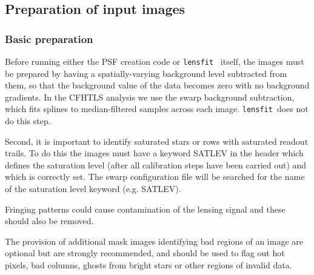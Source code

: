 \documentclass{article}
\def\lensfit{{\tt lensfit}\ }
\begin{document}
\subsection{Preparation of input images}
\subsubsection{Basic preparation}
Before running either the PSF creation code or \lensfit 
itself, the images must be prepared by having a 
spatially-varying background level subtracted from them, so that the background value of the data becomes 
zero with no background gradients. In the CFHTLS analysis we use the swarp background subtraction, which fits splines to 
median-filtered samples across each image. \lensfit does not do this step.

Second, it is important to identify saturated stars or rows with saturated readout trails. To do this the 
images must have a keyword SATLEV in the header which defines the saturation level (after all calibration 
steps have been carried out) and which is correctly set. The swarp 
configuration file will be searched for the name of the saturation level keyword (e.g. SATLEV). 

Fringing patterns could cause contamination of the lensing signal and these should also be removed. 

The provision of additional mask images identifying bad regions of an image are optional but are strongly 
recommended, and should be used to flag out hot pixels, bad columns, ghosts from bright stars or other
regions of invalid data. 
\end{document}
